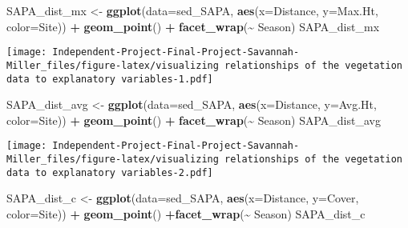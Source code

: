 \documentclass[
]{article}
\newenvironment{Shaded}{\begin{snugshade}}{\end{snugshade}}
\newcommand{\AttributeTok}[1]{\textcolor[rgb]{0.13,0.29,0.53}{#1}}
\newcommand{\FunctionTok}[1]{\textcolor[rgb]{0.13,0.29,0.53}{\textbf{#1}}}
\newcommand{\NormalTok}[1]{#1}
\newcommand{\OtherTok}[1]{\textcolor[rgb]{0.56,0.35,0.01}{#1}}
\newcommand{\SpecialCharTok}[1]{\textcolor[rgb]{0.81,0.36,0.00}{\textbf{#1}}}
\begin{document}
\begin{Shaded}
\begin{Highlighting}[]
\NormalTok{SAPA\_dist\_mx }\OtherTok{\textless{}{-}} \FunctionTok{ggplot}\NormalTok{(}\AttributeTok{data=}\NormalTok{sed\_SAPA, }\FunctionTok{aes}\NormalTok{(}\AttributeTok{x=}\NormalTok{Distance, }\AttributeTok{y=}\NormalTok{Max.Ht, }\AttributeTok{color=}\NormalTok{Site)) }\SpecialCharTok{+} \FunctionTok{geom\_point}\NormalTok{() }\SpecialCharTok{+}  \FunctionTok{facet\_wrap}\NormalTok{(}\SpecialCharTok{\textasciitilde{}}\NormalTok{ Season)}
\NormalTok{SAPA\_dist\_mx}
\end{Highlighting}
\end{Shaded}

\texttt{[image: Independent-Project-Final-Project-Savannah-Miller\_files/figure-latex/visualizing relationships of the vegetation data to explanatory variables-1.pdf]}

\begin{Shaded}
\begin{Highlighting}[]
\NormalTok{SAPA\_dist\_avg }\OtherTok{\textless{}{-}} \FunctionTok{ggplot}\NormalTok{(}\AttributeTok{data=}\NormalTok{sed\_SAPA, }\FunctionTok{aes}\NormalTok{(}\AttributeTok{x=}\NormalTok{Distance, }\AttributeTok{y=}\NormalTok{Avg.Ht, }\AttributeTok{color=}\NormalTok{Site)) }\SpecialCharTok{+} \FunctionTok{geom\_point}\NormalTok{() }\SpecialCharTok{+} \FunctionTok{facet\_wrap}\NormalTok{(}\SpecialCharTok{\textasciitilde{}}\NormalTok{ Season)}
\NormalTok{SAPA\_dist\_avg}
\end{Highlighting}
\end{Shaded}

\texttt{[image: Independent-Project-Final-Project-Savannah-Miller\_files/figure-latex/visualizing relationships of the vegetation data to explanatory variables-2.pdf]}

\begin{Shaded}
\begin{Highlighting}[]
\NormalTok{SAPA\_dist\_c }\OtherTok{\textless{}{-}} \FunctionTok{ggplot}\NormalTok{(}\AttributeTok{data=}\NormalTok{sed\_SAPA, }\FunctionTok{aes}\NormalTok{(}\AttributeTok{x=}\NormalTok{Distance, }\AttributeTok{y=}\NormalTok{Cover, }\AttributeTok{color=}\NormalTok{Site)) }\SpecialCharTok{+} \FunctionTok{geom\_point}\NormalTok{() }\SpecialCharTok{+}\FunctionTok{facet\_wrap}\NormalTok{(}\SpecialCharTok{\textasciitilde{}}\NormalTok{ Season)}
\NormalTok{SAPA\_dist\_c}
\end{Highlighting}
\end{Shaded}
\end{document}
